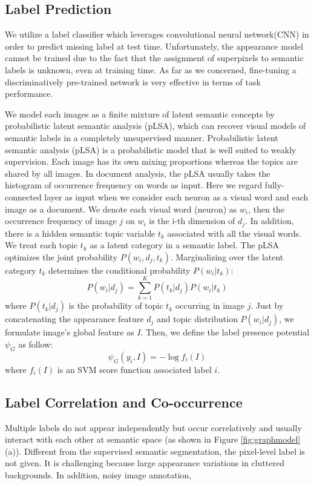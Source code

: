 \subsection{Label Prediction}
We utilize a label classifier which leverages convolutional neural network(CNN) in order to predict missing label at test time. Unfortunately, the appearance model cannot be trained due to the fact that the assignment of superpixels to semantic labels is unknown, even at training time. As far as we concerned, fine-tuning a discriminatively pre-trained network is very effective in terms of task performance.

We model each images as a finite mixture of latent semantic concepts by probabilistic latent semantic analysis (pLSA), which can recover visual models of semantic labels  in a completely unsupervised manner. Probabilistic latent semantic analysis (pLSA) is a probabilistic model that is well suited to weakly supervision. Each image has its own mixing proportions whereas the topics are shared by all images. In document analysis, the pLSA usually takes the histogram of occurrence frequency on words as input. Here we regard fully-connected layer as input when we consider each neuron as a visual word and each image as a document. We denote each visual word (neuron) as $w_i$, then the occurrence frequency of image $j$ on $w_i$ is the i-th dimension of $d_j$. In addition, there is a hidden semantic topic variable $t_k$ associated with all the visual words. We treat each topic $t_k$ as a latent category in a semantic label. The pLSA optimizes the joint probability $P(w_i,d_j,t_k)$. Marginalizing over the latent category $t_k$ determines the conditional probability $P(w_i|t_k)$:
\begin{equation}
  P(w_i|d_j) = \sum_{k=1}^K{P(t_k|d_j)P(w_i|t_k)}
\end{equation}
where $P(t_k|d_j)$ is the probability of topic $t_k$ occurring in image $j$.
Just by concatenating the appearance feature $d_j$ and topic distribution $P(w_i|d_j)$, we formulate image's global feature as $I$. Then, we define the label presence potential $\psi_{G}$ as follow:
\begin{equation}
    \psi_{G}(y_i,I) = -\log f_{i}(I)
\end{equation}
where $f_{i}(I)$ is an SVM score function associated label $i$.

\subsection{Label Correlation and Co-occurrence}
\label{sec:correlation}
Multiple labels do not appear independently but occur correlatively and usually interact with each other at semantic space (as shown in Figure \ref{fig:graphmodel} (a)). Different from the supervised semantic segmentation, the pixel-level label is not given. It is challenging because large appearance variations in cluttered backgrounds. In addition, noisy image annotation,

